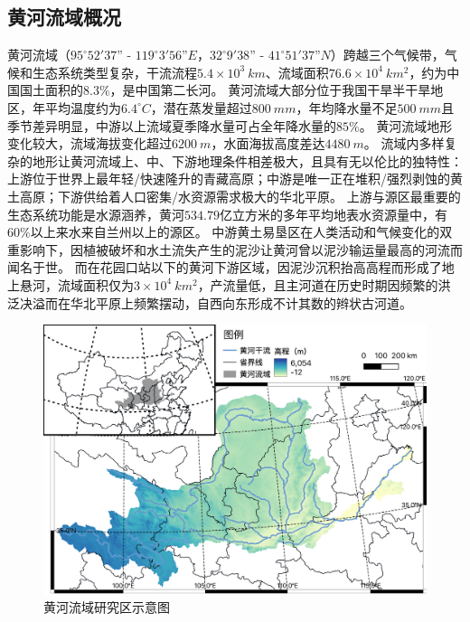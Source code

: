 \subsection{黄河流域概况}

黄河流域（$95^{\circ}52'37”$ - $119^{\circ}3'56”E$，$32^{\circ}9'38”$ - $41^{\circ}51'37”N$）跨越三个气候带，气候和生态系统类型复杂，干流流程$5.4 \times 10^3~km$、流域面积$76.6 \times 10^4~km^2$，约为中国国土面积的$8.3\%$，是中国第二长河。
黄河流域大部分位于我国干旱半干旱地区，年平均温度约为$6.4 ^{\circ}C$，潜在蒸发量超过$800~mm$，年均降水量不足$500~mm$且季节差异明显，中游以上流域夏季降水量可占全年降水量的$85\%$\cite{maxuening2012,wang2007}。
黄河流域地形变化较大，流域海拔变化超过$6200~m$，水面海拔高度差达$4480~m$。
流域内多样复杂的地形让黄河流域上、中、下游地理条件相差极大，且具有无以伦比的独特性：上游位于世界上最年轻/快速隆升的青藏高原；中游是唯一正在堆积/强烈剥蚀的黄土高原；下游供给着人口密集/水资源需求极大的华北平原。
上游与源区最重要的生态系统功能是水源涵养，黄河$534.79$亿立方米的多年平均地表水资源量中，有$60\%$以上来水来自兰州以上的源区\cite{huchunhong2018}。
中游黄土易垦区在人类活动和气候变化的双重影响下，因植被破坏和水土流失产生的泥沙让黄河曾以泥沙输运量最高的河流而闻名于世\cite{best2019}。
而在花园口站以下的黄河下游区域，因泥沙沉积抬高高程而形成了地上悬河，流域面积仅为$3 \times 10^4~km^2$，产流量低，且主河道在历史时期因频繁的洪泛决溢而在华北平原上频繁摆动，自西向东形成不计其数的辫状古河道。


\begin{figure}[!ht] %
    \includegraphics[width=\textwidth]{img/ch1/ch1_study_area.png}
    \caption{黄河流域研究区示意图}\label{ch1:fig:study_area}
\end{figure}

